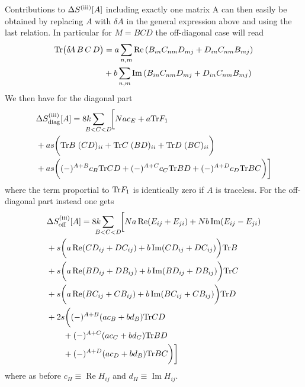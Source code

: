 \documentclass[10pt,a4paper]{article}
\newcommand{\RN}[1]{%
    \textup{\uppercase\expandafter{\romannumeral#1}}%
}
\newcommand{\Tr}{\mathrm{Tr}\vspace{-2pt}}
\newcommand{\deltaA}{\delta \! A}
\begin{document}
Contributions to $\Delta S^{(\RN 3)}[A]$ including exactly one matrix A
can then easily be obtained by replacing $A$ with $\deltaA$ in the
general expression above and using the last relation.
In particular for $M=BCD$ the off-diagonal case will read
\begin{align}
  \Tr \big( \deltaA \, B \, C \, D \big) &=
    a \sum_{n,m} \operatorname{Re}
    \left( B_{in} C_{nm} D_{mj} + D_{in} C_{nm} B_{mj} \right) \\
    &+ b \sum_{n,m} \operatorname{Im}
    \left( B_{in} C_{nm} D_{mj} + D_{in} C_{nm} B_{mj} \right)
\end{align}
We then have for the diagonal part
\begin{align}
  &\Delta S^{(\RN{3})}_{\mathrm{diag}} [A] =
    8k \sum_{\mathclap{B < C < D}}
    \;\;
    \bigg[
      N a c_E + a \Tr F_1 \\
      &+ a s
      \bigg(
      \Tr B \; (C D)_{ii} + \Tr C \; (B D)_{ii} + \Tr D \; (B C)_{ii}
      \bigg) \\
      &+ a s \bigg(
        (-)^{A+B} c_B \Tr C D +
        (-)^{A+C} c_C \Tr B D +
        (-)^{A+D} c_D \Tr B C
      \bigg)
    \bigg]
\end{align}
where the term proportial to $\Tr F_1$ is identically zero if $A$ is traceless.
For the off-diagonal part instead one gets
\begin{align}
  &\Delta S^{(\RN{3})}_{\mathrm{off}} [A] =
    8k \sum_{\mathclap{B < C < D}}
    \;\;
    \bigg[
      N a \operatorname{Re} (E_{ij} + E_{ji}) + N b \operatorname{Im} (E_{ij} - E_{ji}) \\
      &+ s
      \bigg(
        a \operatorname{Re} (C D_{ij} + D C_{ij}) + b \operatorname{Im} (C D_{ij} + D C_{ij})
      \bigg)  \Tr B\\
      &+ s
      \bigg(
        a \operatorname{Re} (B D_{ij} + D B_{ij}) + b \operatorname{Im} (B D_{ij} + D B_{ij})
      \bigg) \Tr C\\
      &+ s
      \bigg(
        a \operatorname{Re} (B C_{ij} + C B_{ij}) + b \operatorname{Im} (B C_{ij} + C B_{ij})
      \bigg) \Tr D \\
      &+ 2 s
      \bigg(
        (-)^{A+B} (a c_B + b d_B) \Tr C D \\
        &\quad \quad + (-)^{A+C} (a c_C + b d_C) \Tr B D \\
        &\quad \quad + (-)^{A+D} (a c_D + b d_B) \Tr B C
      \bigg)
    \bigg]
\end{align}
where as before $c_H \equiv \operatorname{Re} H_{ij}$ and $d_H \equiv \operatorname{Im} H_{ij}$.
\end{document}
